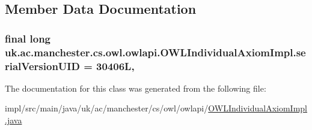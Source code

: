 \subsection{Member Data Documentation}
\hypertarget{classuk_1_1ac_1_1manchester_1_1cs_1_1owl_1_1owlapi_1_1_o_w_l_individual_axiom_impl_acbbafea8409a405899eff4f38894562a}{
\subsubsection[{serial\-Version\-U\-I\-D}]{\setlength{\rightskip}{0pt plus 5cm}final long uk.\-ac.\-manchester.\-cs.\-owl.\-owlapi.\-O\-W\-L\-Individual\-Axiom\-Impl.\-serial\-Version\-U\-I\-D = 30406\-L\hspace{0.3cm}{\ttfamily [static]}, {\ttfamily [private]}}}\label{classuk_1_1ac_1_1manchester_1_1cs_1_1owl_1_1owlapi_1_1_o_w_l_individual_axiom_impl_acbbafea8409a405899eff4f38894562a}


The documentation for this class was generated from the following file\-:\begin{DoxyCompactItemize}
\item 
impl/src/main/java/uk/ac/manchester/cs/owl/owlapi/\hyperlink{_o_w_l_individual_axiom_impl_8java}{O\-W\-L\-Individual\-Axiom\-Impl.\-java}\end{DoxyCompactItemize}
